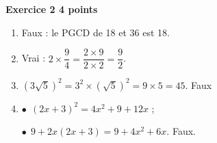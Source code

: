 \textbf{Exercice 2 \hfill 4 points}

\medskip

%
 
\begin{enumerate}
\item %
Faux : le PGCD de 18 et 36 est 18. 
\item %
Vrai : $2 \times \dfrac{9}{4} =  \dfrac{2 \times 9 }{2 \times 2} = \dfrac{9}{2}$.
\item %
$\left(3\sqrt{5} \right)^2 = 3^2 \times \left(\sqrt{5} \right)^2 = 9 \times 5 = 45$. Faux
\item %
$\bullet~~$$(2x + 3)^2 = 4x^2 + 9 + 12x$ ;

$\bullet~~$$9 + 2x(2x + 3) = 9 + 4x^2 + 6x$. Faux.
\end{enumerate}

\bigskip

